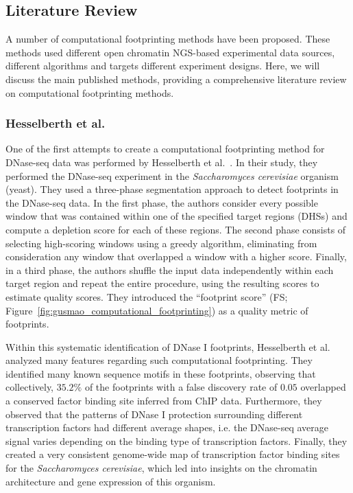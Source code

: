 \subsection{Literature Review}
\label{sec:literature.review}

A number of computational footprinting methods have been proposed. These methods used different open chromatin NGS-based experimental data sources, different algorithms and targets different experiment designs. Here, we will discuss the main published methods, providing a comprehensive literature review on computational footprinting methods.

\subsubsection{Hesselberth et al.}
\label{sec:hesselberth.2}

One of the first attempts to create a computational footprinting method for DNase-seq data was performed by Hesselberth et al.~\cite{hesselberth2009}. In their study, they performed the DNase-seq experiment in the \emph{Saccharomyces cerevisiae} organism (yeast). They used a three-phase segmentation approach to detect footprints in the DNase-seq data. In the first phase, the authors consider every possible window that was contained within one of the specified target regions (DHSs) and compute a depletion score for each of these regions. The second phase consists of selecting high-scoring windows using a greedy algorithm, eliminating from consideration any window that overlapped a window with a higher score. Finally, in a third phase, the authors shuffle the input data independently within each target region and repeat the entire procedure, using the resulting scores to estimate quality scores. They introduced the ``footprint score'' (FS; Figure~\ref{fig:gusmao_computational_footprinting}) as a quality metric of footprints.

Within this systematic identification of DNase I footprints, Hesselberth et al.~\cite{hesselberth2009} analyzed many features regarding such computational footprinting. They identified many known sequence motifs in these footprints, observing that collectively, $35.2\%$ of the footprints with a false discovery rate of $0.05$ overlapped a conserved factor binding site inferred from ChIP data. Furthermore, they observed that the patterns of DNase I protection surrounding different transcription factors had different average shapes, i.e. the DNase-seq average signal varies depending on the binding type of transcription factors. Finally, they created a very consistent genome-wide map of transcription factor binding sites for the \emph{Saccharomyces cerevisiae}, which led into insights on the chromatin architecture and gene expression of this organism.

